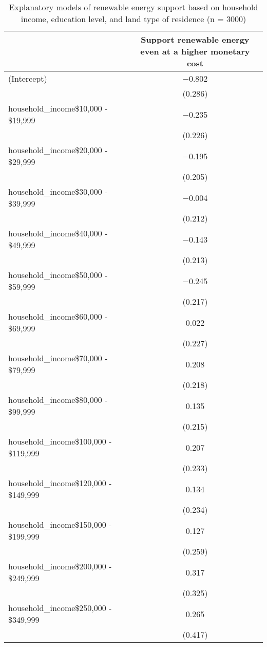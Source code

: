 \documentclass[
  letterpaper,
  DIV=11,
  numbers=noendperiod]{scrartcl}
\begin{document}
\begin{table}
\caption{\label{tbl-model-summary-table}Explanatory models of renewable energy support based on household
income, education level, and land type of residence (n = 3000) }\tabularnewline

\centering
\begin{tabular}[t]{lc}
\toprule
  & Support renewable energy even at a higher monetary cost\\
\midrule
(Intercept) & \num{-0.802}\\
 & \vphantom{1} (\num{0.286})\\
household\_income\$10,000 - \$19,999 & \num{-0.235}\\
 & (\num{0.226})\\
household\_income\$20,000 - \$29,999 & \num{-0.195}\\
 & (\num{0.205})\\
household\_income\$30,000 - \$39,999 & \num{-0.004}\\
 & (\num{0.212})\\
household\_income\$40,000 - \$49,999 & \num{-0.143}\\
 & (\num{0.213})\\
household\_income\$50,000 - \$59,999 & \num{-0.245}\\
 & (\num{0.217})\\
household\_income\$60,000 - \$69,999 & \num{0.022}\\
 & (\num{0.227})\\
household\_income\$70,000 - \$79,999 & \num{0.208}\\
 & (\num{0.218})\\
household\_income\$80,000 - \$99,999 & \num{0.135}\\
 & (\num{0.215})\\
household\_income\$100,000 - \$119,999 & \num{0.207}\\
 & (\num{0.233})\\
household\_income\$120,000 - \$149,999 & \num{0.134}\\
 & (\num{0.234})\\
household\_income\$150,000 - \$199,999 & \num{0.127}\\
 & (\num{0.259})\\
household\_income\$200,000 - \$249,999 & \num{0.317}\\
 & (\num{0.325})\\
household\_income\$250,000 - \$349,999 & \num{0.265}\\
 & (\num{0.417})\\

\end{tabular}
\end{table}
\end{document}
